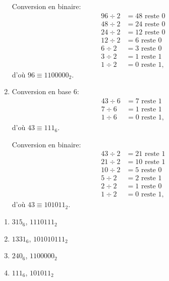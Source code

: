 \begin{exercice}
\begin{sol}
\begin{enumerate}
\begin{minipage}[t]{0.48\linewidth}
        Conversion en binaire:
        \begin{align*}
          96 \div 2 &= 48 \text{ reste } 0 \\
          48 \div 2 &= 24 \text{ reste } 0 \\
          24 \div 2 &= 12 \text{ reste } 0 \\
          12 \div 2 &= 6 \text{ reste } 0 \\
           6 \div 2 &= 3 \text{ reste } 0 \\
           3 \div 2 &= 1 \text{ reste } 1 \\
           1 \div 2 &= 0 \text{ reste } 1,
        \end{align*}
        d'où $96 \equiv 1100000_2$.
      \end{minipage}
    \item
      \begin{minipage}[t]{0.48\linewidth}
        Conversion en base 6:
        \begin{align*}
          43 \div 6 &= 7 \text{ reste } 1 \\
           7 \div 6 &= 1 \text{ reste } 1 \\
           1 \div 6 &= 0 \text{ reste } 1,
        \end{align*}
        d'où $43 \equiv 111_6$.
      \end{minipage}
      \hfill
      \begin{minipage}[t]{0.48\linewidth}
        Conversion en binaire:
        \begin{align*}
          43 \div 2 &= 21 \text{ reste } 1 \\
          21 \div 2 &= 10 \text{ reste } 1 \\
          10 \div 2 &= 5 \text{ reste } 0 \\
           5 \div 2 &= 2 \text{ reste } 1 \\
           2 \div 2 &= 1 \text{ reste } 0 \\
           1 \div 2 &= 0 \text{ reste } 1,
        \end{align*}
        d'où $43 \equiv 101011_2$.
      \end{minipage}
    \end{enumerate}
  \end{sol}
  \begin{rep}
    \begin{enumerate}
    \item $315_6$, $1110111_2$
    \item $1331_6$, $101010111_2$
    \item $240_6$, $1100000_2$
    \item $111_6$, $101011_2$
    \end{enumerate}
  \end{rep}
\end{exercice}

